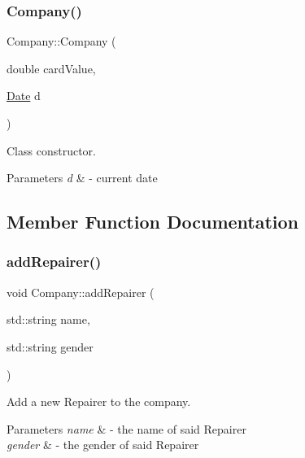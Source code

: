 \subsubsection{\texorpdfstring{Company()}{Company()}}
{\footnotesize\ttfamily Company\+::\+Company (\begin{DoxyParamCaption}\item[{double}]{card\+Value,  }\item[{\mbox{\hyperlink{class_date}{Date}}}]{d }\end{DoxyParamCaption})}



Class constructor. 


\begin{DoxyParams}{Parameters}
{\em d} & -\/ current date \\
\hline
\end{DoxyParams}


\subsection{Member Function Documentation}
\mbox{\label{class_company_a0f5c39b78a484f841f71bbcc33946774}} 
\subsubsection{\texorpdfstring{add\+Repairer()}{addRepairer()}}
{\footnotesize\ttfamily void Company\+::add\+Repairer (\begin{DoxyParamCaption}\item[{std\+::string}]{name,  }\item[{std\+::string}]{gender }\end{DoxyParamCaption})}



Add a new Repairer to the company. 


\begin{DoxyParams}{Parameters}
{\em name} & -\/ the name of said Repairer \\
\hline
{\em gender} & -\/ the gender of said Repairer \\
\hline
\end{DoxyParams}
\mbox{\label{class_company_aa5eac670a965d063cd700acc09effec7}} 
